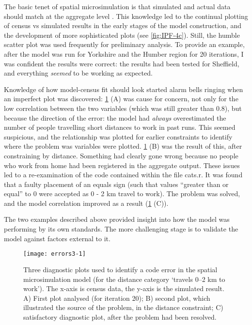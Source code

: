 The basic tenet of spatial microsimulation is that simulated and actual data
should match at the aggregate level \citep{Ballas2007simb}.
This knowledge led to the
continual plotting of census vs simulated results in the early stages of the
model construction, and the development of more
sophisticated plots (see \cref{fig:IPF-4c}).
Still, the humble scatter plot was used frequently for
preliminary analysis. To provide an example, after the model was run for
Yorkshire
and the Humber region for 20 iterations, I was confident the results were
correct: the results had been tested for Sheffield, and everything
\emph{seemed} to be working as expected.

Knowledge of how model-census fit should look started alarm bells
ringing when an imperfect plot was discovered:
\cref{fig:error} (A) was cause for concern, not only for the low
correlation between the two variables (which was still greater than 0.8), but
because the direction of the error: the model had \emph{always} overestimated the
number of people travelling short distances to work in past runs.
This seemed suspicious, and the relationship was plotted for earlier constraints
to identify where the problem was variables were plotted.
\cref{fig:error} (B) was the
result of this, after constraining by distance.
Something had clearly gone wrong because no people who work
from home had been registered in the aggregate output. These issues led to
a re-examination of the code contained
within the file cats.r. It was found that a faulty placement of an
equals sign (such that values ``greater than or equal'' to 0 were accepted as 0
- 2 km travel to work). The problem was solved, and the model correlation
improved as a result (\cref{fig:error} (C)).

The two examples described above provided insight into how the model was
performing by its own standards. The more challenging stage is to validate
the model against factors external to it. %

\begin{figure}[h]
  \begin{center}
\texttt{[image: errors3-1]}      \end{center}
 \caption[Diagnostic plots to identify model error]{Three diagnostic plots used
to identify a code error in the spatial microsimulation model (for the
distance category `travels 0--2 km to work'). The x-axis is
census data, the y-axis is the simulated result. A) First plot
analysed (for iteration 20); B) second plot, which illustrated the source of the
problem, in the distance constraint; C) satisfactory diagnostic plot,
after the problem had been resolved.}
 \label{fig:error}
\end{figure}

